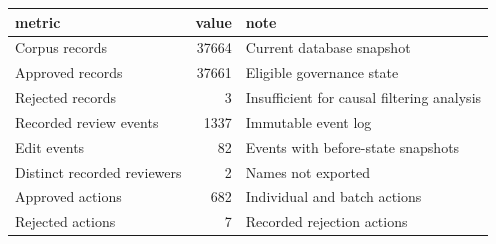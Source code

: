 \begin{tabular}{lrl}
\toprule
metric & value & note \\
\midrule
Corpus records & 37664 & Current database snapshot \\
Approved records & 37661 & Eligible governance state \\
Rejected records & 3 & Insufficient for causal filtering analysis \\
Recorded review events & 1337 & Immutable event log \\
Edit events & 82 & Events with before-state snapshots \\
Distinct recorded reviewers & 2 & Names not exported \\
Approved actions & 682 & Individual and batch actions \\
Rejected actions & 7 & Recorded rejection actions \\
\bottomrule
\end{tabular}
